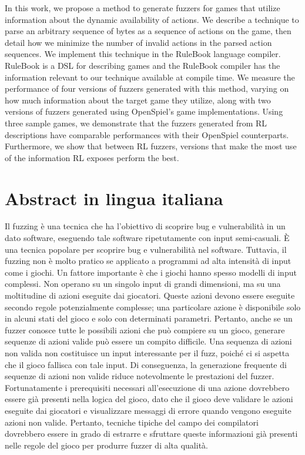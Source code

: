 \documentclass{Configuration_Files/PoliMi3i_thesis}
\begin{document}
In this work, we propose a method to generate fuzzers for games that utilize information about the dynamic availability of actions.
We describe a technique to parse an arbitrary sequence of bytes as a sequence of actions on the game, then detail how we minimize the number of invalid actions in the parsed action sequences.
We implement this technique in the RuleBook language compiler. RuleBook is a DSL for describing games and the RuleBook compiler has the information relevant to our technique available at compile time.
We measure the performance of four versions of fuzzers generated with this method, varying on how much information about the target game they utilize, along with two versions of fuzzers generated using OpenSpiel's game implementations.
Using three sample games, we demonstrate that the fuzzers generated from RL descriptions have comparable performances with their OpenSpiel counterparts.
Furthermore, we show that between RL fuzzers, versions that make the most use of the information RL exposes perform the best.

\chapter*{Abstract in lingua italiana}
Il fuzzing è una tecnica che ha l'obiettivo di scoprire bug e
vulnerabilità in un dato software, eseguendo tale software
ripetutamente con input semi-casuali.
È una tecnica popolare per scoprire bug e vulnerabilità nel software.
Tuttavia, il fuzzing non è molto pratico se applicato a programmi ad alta intensità di input come i giochi.
Un fattore importante è che i giochi hanno spesso modelli di input complessi.
Non operano su un singolo input di grandi dimensioni, ma su una moltitudine di azioni eseguite dai giocatori.
Queste azioni devono essere eseguite secondo regole potenzialmente complesse; una particolare azione è disponibile solo in alcuni stati del gioco e solo con determinati parametri.
Pertanto, anche se un fuzzer conosce tutte le possibili azioni che può compiere su un gioco, generare sequenze di azioni valide può essere un compito difficile.
Una sequenza di azioni non valida non costituisce un input interessante per il fuzz, poiché ci si aspetta che il gioco fallisca con tale input.
Di conseguenza, la generazione frequente di sequenze di azioni non valide riduce notevolmente le prestazioni del fuzzer.
Fortunatamente i prerequisiti necessari all'esecuzione di una azione
dovrebbero essere già presenti nella logica del gioco, dato che il gioco deve validare le azioni eseguite dai giocatori e visualizzare messaggi di errore quando vengono eseguite azioni non valide.
Pertanto, tecniche tipiche del campo dei compilatori dovrebbero essere in grado di estrarre e sfruttare queste informazioni già presenti nelle regole del gioco per produrre fuzzer di alta qualità.
\end{document}
